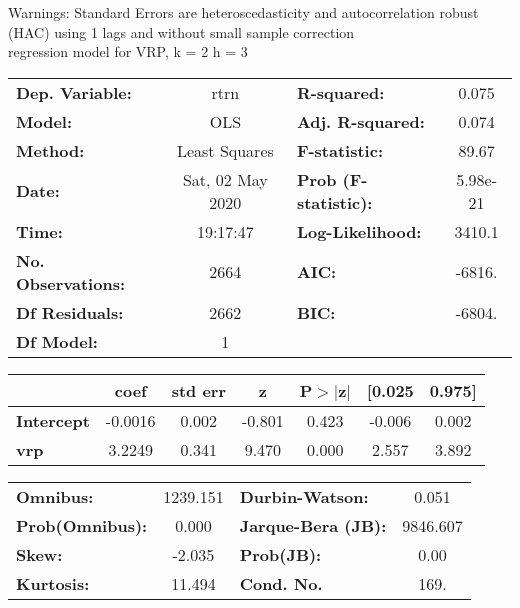 Warnings: \newline
 [1] Standard Errors are heteroscedasticity and autocorrelation robust (HAC) using 1 lags and without small sample correction\\ 

regression model for VRP, k = 2 h = 3\begin{center}
\begin{tabular}{lclc}
\toprule
\textbf{Dep. Variable:}    &       rtrn       & \textbf{  R-squared:         } &     0.075   \\
\textbf{Model:}            &       OLS        & \textbf{  Adj. R-squared:    } &     0.074   \\
\textbf{Method:}           &  Least Squares   & \textbf{  F-statistic:       } &     89.67   \\
\textbf{Date:}             & Sat, 02 May 2020 & \textbf{  Prob (F-statistic):} &  5.98e-21   \\
\textbf{Time:}             &     19:17:47     & \textbf{  Log-Likelihood:    } &    3410.1   \\
\textbf{No. Observations:} &        2664      & \textbf{  AIC:               } &    -6816.   \\
\textbf{Df Residuals:}     &        2662      & \textbf{  BIC:               } &    -6804.   \\
\textbf{Df Model:}         &           1      & \textbf{                     } &             \\
\bottomrule
\end{tabular}
\begin{tabular}{lcccccc}
                   & \textbf{coef} & \textbf{std err} & \textbf{z} & \textbf{P$> |$z$|$} & \textbf{[0.025} & \textbf{0.975]}  \\
\midrule
\textbf{Intercept} &      -0.0016  &        0.002     &    -0.801  &         0.423        &       -0.006    &        0.002     \\
\textbf{vrp}       &       3.2249  &        0.341     &     9.470  &         0.000        &        2.557    &        3.892     \\
\bottomrule
\end{tabular}
\begin{tabular}{lclc}
\textbf{Omnibus:}       & 1239.151 & \textbf{  Durbin-Watson:     } &    0.051  \\
\textbf{Prob(Omnibus):} &   0.000  & \textbf{  Jarque-Bera (JB):  } & 9846.607  \\
\textbf{Skew:}          &  -2.035  & \textbf{  Prob(JB):          } &     0.00  \\
\textbf{Kurtosis:}      &  11.494  & \textbf{  Cond. No.          } &     169.  \\
\bottomrule
\end{tabular}
\end{center}

